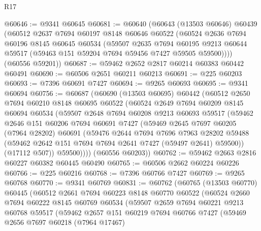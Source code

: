 \begin{lexlean}{R17}
\begin{coremodule}
@60646 := @9341 @60645
@60681 := @60640
    (@60643
      (@13503 @60646)
      @60439
      (@60512
        @2637
        @7694
        @60197
        @8148
        @60646
        @60522
        (@60524
          @2636
          @7694
          @60196
          @8145
          @60645
          @60534
          (@59507
            @2635
            @7694
            @60195
            @9213
            @60644
            @59517
            (@59463 @151 @59204 @7694 @59456 @7427 @59505 @59500))))
      (@60556 @59201))
@60687 := @59462 @2652 @2817 @60214 @60383 @60442 @60491
@60690 := @60506 @2651 @60211 @60213
@60691 := @225 @60203
@60693 := @7396 @60691 @7427
@60694 := @9265 @60693
@60695 := @9341 @60694
@60756 := @60687
    (@60690
      (@13503 @60695)
      @60442
      (@60512
        @2650
        @7694
        @60210
        @8148
        @60695
        @60522
        (@60524
          @2649
          @7694
          @60209
          @8145
          @60694
          @60534
          (@59507
            @2648
            @7694
            @60208
            @9213
            @60693
            @59517
            (@59462
              @2646
              @151
              @60206
              @7694
              @60691
              @7427
              (@59469
                @2645
                @7697
                @60205
                (@7964 @28202)
                @60691
                (@59476
                  @2644
                  @7694
                  @7696
                  @7963
                  @28202
                  @59488
                  (@59462 @2642 @151 @7694 @7694 @2641 @7427 (@59497 @2641) @59500))
                (@17112 @507))
              @59500))))
      (@60556 @60203))
@60762 := @59462 @2663 @2816 @60227 @60382 @60445 @60490
@60765 := @60506 @2662 @60224 @60226
@60766 := @225 @60216
@60768 := @7396 @60766 @7427
@60769 := @9265 @60768
@60770 := @9341 @60769
@60831 := @60762
    (@60765
      (@13503 @60770)
      @60445
      (@60512
        @2661
        @7694
        @60223
        @8148
        @60770
        @60522
        (@60524
          @2660
          @7694
          @60222
          @8145
          @60769
          @60534
          (@59507
            @2659
            @7694
            @60221
            @9213
            @60768
            @59517
            (@59462
              @2657
              @151
              @60219
              @7694
              @60766
              @7427
              (@59469
                @2656
                @7697
                @60218
                (@7964 @17467)

\end{coremodule}
\end{lexlean}

